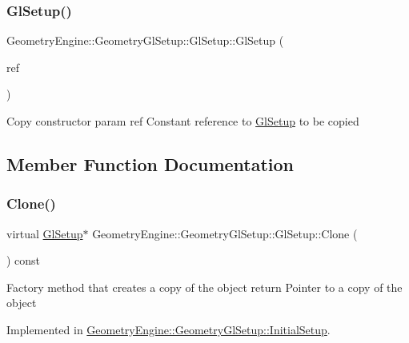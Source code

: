 \subsubsection{\texorpdfstring{GlSetup()}{GlSetup()}}
{\footnotesize\ttfamily Geometry\+Engine\+::\+Geometry\+Gl\+Setup\+::\+Gl\+Setup\+::\+Gl\+Setup (\begin{DoxyParamCaption}\item[{const \mbox{\hyperlink{class_geometry_engine_1_1_geometry_gl_setup_1_1_gl_setup}{Gl\+Setup}} \&}]{ref }\end{DoxyParamCaption})\hspace{0.3cm}{\ttfamily [inline]}}

Copy constructor param ref Constant reference to \mbox{\hyperlink{class_geometry_engine_1_1_geometry_gl_setup_1_1_gl_setup}{Gl\+Setup}} to be copied 

\subsection{Member Function Documentation}
\mbox{\label{class_geometry_engine_1_1_geometry_gl_setup_1_1_gl_setup_adf97b18fd8af32c63a189983ab35d5ae}} 
\subsubsection{\texorpdfstring{Clone()}{Clone()}}
{\footnotesize\ttfamily virtual \mbox{\hyperlink{class_geometry_engine_1_1_geometry_gl_setup_1_1_gl_setup}{Gl\+Setup}}$\ast$ Geometry\+Engine\+::\+Geometry\+Gl\+Setup\+::\+Gl\+Setup\+::\+Clone (\begin{DoxyParamCaption}{ }\end{DoxyParamCaption}) const\hspace{0.3cm}{\ttfamily [pure virtual]}}

Factory method that creates a copy of the object return Pointer to a copy of the object 

Implemented in \mbox{\hyperlink{class_geometry_engine_1_1_geometry_gl_setup_1_1_initial_setup_ade45cd909edd6ff3cae7323d5e1c53d0}{Geometry\+Engine\+::\+Geometry\+Gl\+Setup\+::\+Initial\+Setup}}.

\mbox{\label{class_geometry_engine_1_1_geometry_gl_setup_1_1_gl_setup_a97e569658af28d7d60a3be95fa8cb0af}} 
